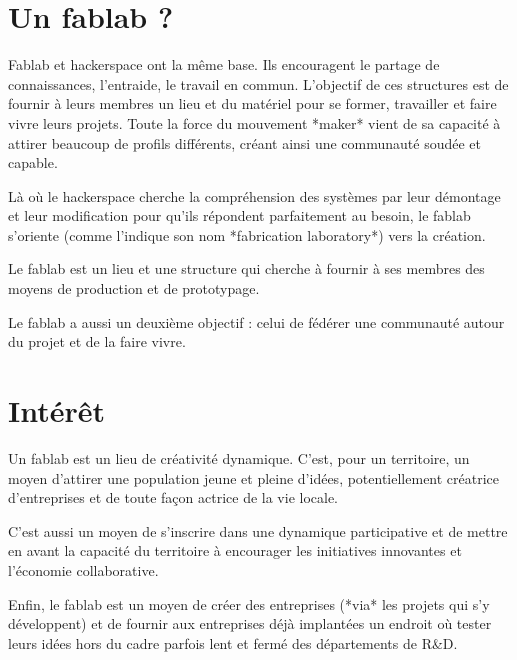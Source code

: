 \section{Un fablab ?}

Fablab et hackerspace ont la même base. Ils encouragent le partage de connaissances, l'entraide, le travail en commun.
L'objectif de ces structures est de fournir à leurs membres un lieu et du matériel pour se former, travailler et faire
vivre leurs projets. Toute la force du mouvement *maker* vient de sa capacité à attirer beaucoup de profils différents,
créant ainsi une communauté soudée et capable.

Là où le hackerspace cherche la compréhension des systèmes par leur démontage et leur modification pour qu'ils
répondent parfaitement au besoin, le fablab s'oriente (comme l'indique son nom *fabrication laboratory*) vers la
création.

Le fablab est un lieu et une structure qui cherche à fournir à ses membres des moyens de production et de prototypage.

Le fablab a aussi un deuxième objectif : celui de fédérer une communauté autour du projet et de la faire vivre.

\section{Intérêt}

Un fablab est un lieu de créativité dynamique. C'est, pour un  territoire, un moyen d'attirer une population
jeune et pleine d'idées, potentiellement créatrice d'entreprises et de toute façon actrice de la vie locale.

C'est aussi un moyen de s'inscrire dans une dynamique participative et de mettre en avant la capacité du territoire à
encourager les initiatives innovantes et l'économie collaborative.

Enfin, le fablab est un moyen de créer des entreprises (*via* les projets qui s'y développent) et de fournir aux
entreprises déjà implantées un endroit où tester leurs idées hors du cadre parfois lent et fermé des départements de R\&D.

